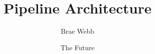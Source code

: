 \documentclass{csse4400}
\title{Pipeline Architecture}
\author{Brae Webb}
\date{{\color{red} The Future}}
\begin{document}
\makecover





\end{document}
